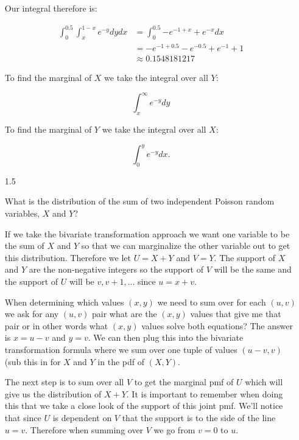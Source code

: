 \begin{enumerate}
 
 Our integral therefore is:
 
 \begin{equation}
 \begin{split}
 \int_0^{0.5}{\int_x^{1-x}{e^{-y}dy}dx} &= \int_0^{0.5}{-e^{-1+x} + e^{-x}dx} \\
& =  -e^{-1+0.5} - e^{-0.5} + e^{-1} + 1 \\
& \approx 0.1548181217
 \end{split}
 \end{equation}
 
 To find the marginal of $X$ we take the integral over all $Y$:
 
 \begin{equation}
 \int_x^{\infty}{e^{-y}dy}
 \end{equation}
 
 \noindent To find the marginal of $Y$ we take the integral over all $X$:
 
 \begin{equation}
 \int_0^{y}{e^{-y}dx}.
 \end{equation}
 
 
\item[1.5] \label{item:sum_possion}

What is the distribution of the sum of two independent Poisson random variables, $X$ and $Y$?

If we take the bivariate transformation approach we want one variable to be the sum of $X$ and $Y$ so that we can marginalize the other variable out to get this distribution. Therefore we let $U=X+Y$ and $V=Y$. The support of $X$ and $Y$ are the non-negative integers so the support of $V$ will be the same and the support of $U$ will be $v, v+1, ...$ since $u=x+v$.

When determining which values $(x,y)$ we need to sum over for each $(u,v)$ we ask for any $(u,v)$ pair what are the $(x,y)$ values that give me that pair or in other words what $(x,y)$ values solve both equations? The answer is $x=u-v$ and $y=v$. We can then plug this into the bivariate transformation formula where we sum over one tuple of values $(u-v, v)$ (sub this in for $X$ and $Y$ in the pdf of $(X,Y)$.

The next step is to sum over all $V$ to get the marginal pmf of $U$ which will give us the distribution of $X+Y$. It is important to remember when doing this that we take a close look of the support of this joint pmf. We'll notice that since $U$ is dependent on $V$ that the support is to the side of the line $u=v$. Therefore when summing over $V$ we go from $v=0$ to $u$.


\end{enumerate}
